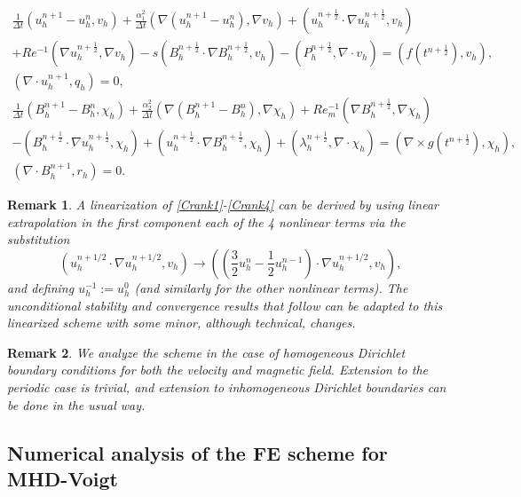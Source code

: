\documentclass[11pt]{article}%
\numberwithin{equation}{section}
\newtheorem{remark}{Remark}[section]
\begin{document}
\begin{eqnarray}
\frac{1}{\Delta t}(u_{h}^{n+1}-u_{h}^{n},v_{h})
+ \frac{\alpha_1^2}{\Delta t}(\nabla (u_{h}^{n+1}- u_{h}^{n}),\nabla v_{h})
+ (u_{h}^{n+\frac{1}{2}} \cdot \nabla u_{h}^{n+\frac{1}{2}},v_{h})\nonumber\\
+Re^{-1}(\nabla u_{h}^{n+\frac{1}{2}},\nabla v_{h})
-s(B_{h}^{n+\frac{1}{2}} \cdot \nabla B_{h}^{n+\frac{1}{2}},v_{h})
-(P_{h}^{n+\frac{1}{2}},\nabla\cdot v_{h})
=(f(t^{n+\frac{1}{2}}),v_{h}), \label{Crank1}\\
(\nabla\cdot u_{h}^{n+1},q_{h}) = 0, \label{Crank2}\\
\frac{1}{\Delta t}(B_{h}^{n+1}-B_{h}^{n},\chi_{h})
+ \frac{\alpha_2^2}{\Delta t}(\nabla  (B_{h}^{n+1}- B_{h}^{n}),\nabla  \chi_{h})
+Re_{m}^{-1}(\nabla  B_{h}^{n+\frac{1}{2}},\nabla \chi_{h})\nonumber\\
-(B_{h}^{n+\frac{1}{2}} \cdot \nabla u_{h}^{n+\frac{1}{2}},\chi_{h})
+(u_{h}^{n+\frac{1}{2}}\cdot \nabla B_{h}^{n+\frac{1}{2}},\chi_{h})
+(\lambda_{h}^{n+\frac{1}{2}},\nabla\cdot\chi_{h})
=(\nabla\times g(t^{n+\frac{1}{2}}),\chi_{h}), \label{Crank3}\\
(\nabla\cdot B_{h}^{n+1},r_{h}) = 0. \label{Crank4}
\end{eqnarray}

\begin{remark}
A linearization of \eqref{Crank1}-\eqref{Crank4} can be derived by using linear extrapolation in the first component each of the 4 nonlinear terms via the substitution
\[
(u_h^{n+1/2} \cdot\nabla u_h^{n+1/2},v_h) \rightarrow 
\left((\frac{3}{2} u_h^{n} - \frac12 u_h^{n-1}) \cdot\nabla u_h^{n+1/2},v_h\right),
\]
and defining $u_h^{-1}:=u_h^0$ (and similarly for the other nonlinear terms).  The unconditional stability and convergence results that follow can be adapted to this linearized scheme with some minor, although technical, changes.
\end{remark}

\begin{remark}
We analyze the scheme in the case of homogeneous Dirichlet boundary conditions for both the velocity and magnetic field.  Extension to the periodic case is trivial, and extension to inhomogeneous Dirichlet boundaries can be done in the usual way.
\end{remark}

\subsection{Numerical analysis of the FE scheme for MHD-Voigt}
\end{document}
